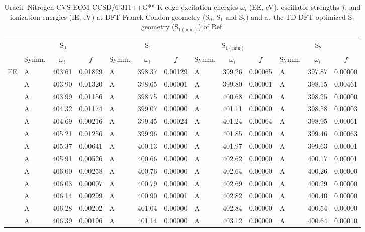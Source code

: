 \documentclass[journal=jctcce,manuscript=article]{achemso}
\begin{document}
\begin{table}
\caption{Uracil. Nitrogen CVS-EOM-CCSD/6-311++G** K-edge excitation energies $\omega_i$ (EE, eV), oscillator strengths $f$, and ionization energies (IE, eV) at DFT Franck-Condon geometry (S$_0$, S$_1$ and S$_2$) and at the TD-DFT optimized S$_1$ geometry (S$_{1(\text{min})}$) of Ref. 
\label{Tab:Uracil_DFT:Nitrogen}}
\scriptsize
\begin{tabular}{l|lcc|lcc|lcc|lcc}
\cline{2-13}
& \multicolumn{3}{c|}{S$_0$}
& \multicolumn{3}{c|}{S$_1$}  
& \multicolumn{3}{c|}{S$_{1(\text{min})}$}
& \multicolumn{3}{c}{S$_2$}
\\
\cline{2-13}
& Symm. & $\omega_i$ & $f$ 
& Symm. & $\omega_i$ & $f$ 
& Symm. & $\omega_i$ & $f$ 
& Symm. & $\omega_i$ & $f$\\
\hline
  EE 
& A & 403.61 & 0.01829 & A & 398.37 & 0.00129 & A & 399.26 & 0.00065 & A & 397.87 & 0.00000 \\
& A & 403.90 & 0.01320 & A & 398.65 & 0.00001 & A & 399.80 & 0.00001 & A & 398.15 & 0.00461 \\
& A & 403.99 & 0.01156 & A & 398.75 & 0.00000 & A & 400.68 & 0.00000 & A & 398.25 & 0.00000 \\
& A & 404.32 & 0.01174 & A & 399.07 & 0.00000 & A & 401.11 & 0.00000 & A & 398.58 & 0.00003 \\
& A & 404.69 & 0.00216 & A & 399.45 & 0.00024 & A & 401.24 & 0.00004 & A & 398.95 & 0.00061 \\
& A & 405.21 & 0.01256 & A & 399.96 & 0.00000 & A & 401.85 & 0.00000 & A & 399.46 & 0.00063 \\
& A & 405.37 & 0.00641 & A & 400.13 & 0.00000 & A & 401.97 & 0.00000 & A & 399.63 & 0.00001 \\
& A & 405.91 & 0.00526 & A & 400.66 & 0.00000 & A & 402.62 & 0.00000 & A & 400.17 & 0.00001 \\
& A & 406.00 & 0.00258 & A & 400.76 & 0.00000 & A & 402.64 & 0.00000 & A & 400.26 & 0.00000 \\
& A & 406.03 & 0.00007 & A & 400.79 & 0.00000 & A & 402.69 & 0.00000 & A & 400.29 & 0.00000 \\
& A & 406.14 & 0.00299 & A & 400.90 & 0.00001 & A & 402.82 & 0.00000 & A & 400.40 & 0.00000 \\
& A & 406.28 & 0.00202 & A & 401.04 & 0.00000 & A & 402.84 & 0.00000 & A & 400.54 & 0.00000 \\
& A & 406.39 & 0.00196 & A & 401.14 & 0.00000 & A & 403.12 & 0.00000 & A & 400.64 & 0.00010 \\

\end{tabular}
\end{table}
\end{document}
